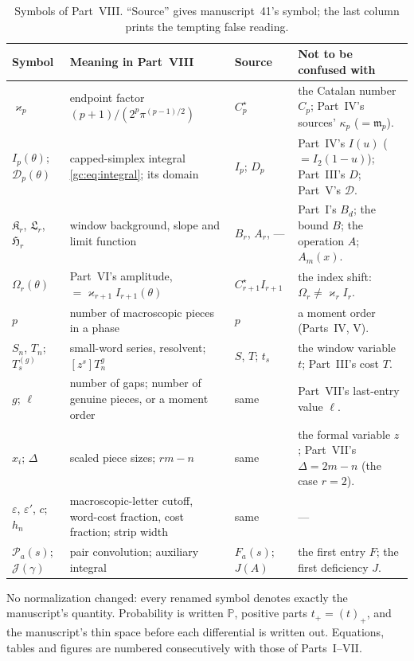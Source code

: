 \documentclass[11pt,a4paper]{article}
\theoremstyle{definition}\newaliascnt{definition}{theorem}
\theoremstyle{remark}\newaliascnt{remark}{theorem}
\newcommand{\ljP}{\mathbb P}
\newcommand{\prpos}[1]{(#1)_+}
\begin{document}
\begin{table}[htbp]
\centering\small
\caption{Symbols of Part~VIII. ``Source'' gives manuscript~41's symbol; the
last column prints the tempting false reading.}
\label{gc:tab:notation}
\begin{tabular}{>{\raggedright}p{.19\linewidth}>{\raggedright}p{.30\linewidth}>{\raggedright}p{.11\linewidth}>{\raggedright\arraybackslash}p{.28\linewidth}}
\toprule
Symbol & Meaning in Part~VIII & Source & Not to be confused with\\
\midrule
$\varkappa_p$ & endpoint factor $(p+1)/(2^p\pi^{(p-1)/2})$ & $C_p^\star$ &
 the Catalan number $C_p$; Part~IV's sources' $\kappa_p$ ($=\mathfrak m_p$).\\
$I_p(\theta)$; $\mathcal D_p(\theta)$ & capped-simplex integral
 \eqref{gc:eq:integral}; its domain & $I_p$; $D_p$ & Part~IV's $I(u)$
 ($=I_2(1-u)$); Part~III's $D$; Part~V's $\mathcal D$.\\
$\mathfrak K_r$, $\mathfrak L_r$, $\mathfrak H_r$ & window background, slope
 and limit function & $B_r$, $A_r$, --- & Part~I's $B_d$; the bound $B$; the
 operation $A$; $A_m(x)$.\\
$\Omega_r(\theta)$ & Part~VI's amplitude, $=\varkappa_{r+1}I_{r+1}(\theta)$ &
 $C_{r+1}^\star I_{r+1}$ & the index shift: $\Omega_r\ne\varkappa_rI_r$.\\
$p$ & number of macroscopic pieces in a phase & $p$ & a moment order (Parts~IV,
 V).\\
$S_n$, $T_n$; $T^{(g)}_s$ & small-word series, resolvent; $[z^s]T_n^g$ & $S$,
 $T$; $t_s$ & the window variable $t$; Part~III's cost $T$.\\
$g$; $\ell$ & number of gaps; number of genuine pieces, or a moment order &
 same & Part~VII's last-entry value $\ell$.\\
$x_i$; $\Delta$ & scaled piece sizes; $rm-n$ & same & the formal variable $z$;
 Part~VII's $\Delta=2m-n$ (the case $r=2$).\\
$\varepsilon$, $\varepsilon'$, $c$; $h_n$ & macroscopic-letter cutoff,
 word-cost fraction, cost fraction; strip width & same & ---\\
$\mathcal P_a(s)$; $\mathcal J(\gamma)$ & pair convolution; auxiliary integral
 & $F_a(s)$; $J(A)$ & the first entry $F$; the first deficiency $J$.\\
\bottomrule
\end{tabular}
\end{table}

No normalization changed: every renamed symbol denotes exactly the
manuscript's quantity. Probability is written $\ljP$, positive parts
$t_+=\prpos t$, and the manuscript's thin space before each differential is
written out. Equations, tables and figures are numbered consecutively with
those of Parts~I--VII.
\end{document}
